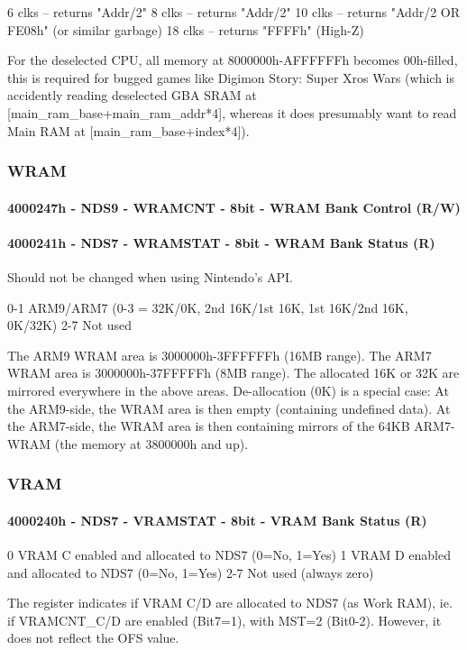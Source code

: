\documentclass[11pt,a4paper]{proc}
\begin{document}
\begin{flushleft}
  6 clks   -- returns "Addr/2"
  8 clks   -- returns "Addr/2"
  10 clks  -- returns "Addr/2 OR FE08h" (or similar garbage)
  18 clks  -- returns "FFFFh" (High-Z)

For the deselected CPU, all memory at 8000000h-AFFFFFFh becomes 00h-filled, this is required for bugged games like Digimon Story: Super Xros Wars (which is accidently reading deselected GBA SRAM at [main\_ram\_base+main\_ram\_addr*4], whereas it does presumably want to read Main RAM at [main\_ram\_base+index*4]).

\subsubsection{WRAM}
\paragraph{4000247h - NDS9 - WRAMCNT - 8bit - WRAM Bank Control (R/W)}
\paragraph{4000241h - NDS7 - WRAMSTAT - 8bit - WRAM Bank Status (R)}
Should not be changed when using Nintendo's API.

  0-1   ARM9/ARM7 (0-3 = 32K/0K, 2nd 16K/1st 16K, 1st 16K/2nd 16K, 0K/32K)
  2-7   Not used

The ARM9 WRAM area is 3000000h-3FFFFFFh (16MB range).
The ARM7 WRAM area is 3000000h-37FFFFFh (8MB range).
The allocated 16K or 32K are mirrored everywhere in the above areas.
De-allocation (0K) is a special case: At the ARM9-side, the WRAM area is then empty (containing undefined data). At the ARM7-side, the WRAM area is then containing mirrors of the 64KB ARM7-WRAM (the memory at 3800000h and up).

\subsubsection{VRAM}
\paragraph{4000240h - NDS7 - VRAMSTAT - 8bit - VRAM Bank Status (R)}

  0     VRAM C enabled and allocated to NDS7  (0=No, 1=Yes)
  1     VRAM D enabled and allocated to NDS7  (0=No, 1=Yes)
  2-7   Not used (always zero)

The register indicates if VRAM C/D are allocated to NDS7 (as Work RAM), ie. if VRAMCNT\_C/D are enabled (Bit7=1), with MST=2 (Bit0-2). However, it does not reflect the OFS value.


\end{flushleft}
\end{document}
